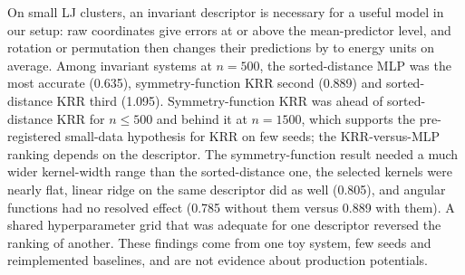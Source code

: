 On small LJ clusters, an invariant descriptor is necessary for a useful model in our setup: raw coordinates give errors at or above the mean-predictor level, and rotation or permutation then changes their predictions by  to  energy units on average. Among invariant systems at $n{=}500$, the sorted-distance MLP was the most accurate (0.635), symmetry-function KRR second (0.889) and sorted-distance KRR third (1.095). Symmetry-function KRR was ahead of sorted-distance KRR for $n\le500$ and behind it at $n{=}1500$, which supports the pre-registered small-data hypothesis for KRR on few seeds; the KRR-versus-MLP ranking depends on the descriptor. The symmetry-function result needed a much wider kernel-width range than the sorted-distance one, the selected kernels were nearly flat, linear ridge on the same descriptor did as well (0.805), and angular functions had no resolved effect (0.785 without them versus 0.889 with them). A shared hyperparameter grid that was adequate for one descriptor reversed the ranking of another. These findings come from one toy system, few seeds and reimplemented baselines, and are not evidence about production potentials.
